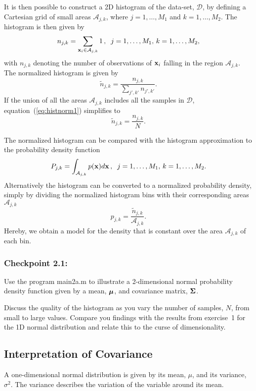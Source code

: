 \documentclass[times,12pt]{article}    %
\def\x{{\bf x}}
\def\A{\mathcal{A}}
\def\D{\mathcal{D}}
\def\m{\text{\boldmath $\mu$}}
\def\S{\text{\boldmath $\Sigma$}}
\begin{document}
It is then possible to construct a 2D histogram of the data-set, $\D$,
by defining a Cartesian grid of small areas $\A_{j,k}$, where $j=1,\ldots,
M_1$ and $k=1,\ldots, M_2$. The histogram
is then given by
\begin{equation}
  n_{j,k} =  \sum_{\x_i \in \A_{j,k}} 1 \,, \;\; j=1,\ldots,
M_1,\,k=1,\ldots, M_2,
\end{equation}
with $n_{j,k}$ denoting the number of observations of $\x_i$ falling in the region $\A_{j,k}$.
The normalized histogram is given by
\begin{equation}
\tilde{n}_{j,k} = \frac{n_{j,k}}{\sum_{j',k'} n_{{j',k'}}}.
\label{eq:histnorm1}
\end{equation}
If the union of all the areas $\A_{j,k}$ includes all the samples in
$\D$, equation~(\ref{eq:histnorm1}) simplifies to
\begin{equation}
\tilde{n}_{j,k} = \frac{n_{j,k}}{N}.
\label{eq:histnorm2}
\end{equation}

The normalized histogram can be compared with the histogram approximation
to the probability density function
\begin{equation}
P_{j,k} =  \int_{\A_{j,k}} p(\x) d\x \,, \;\; j=1,\ldots,
M_1,\,k=1,\ldots, M_2.
\end{equation}
Alternatively the histogram can be converted to a normalized probability density, simply by dividing the normalized histogram bins with their corresponding areas $\A_{j,k}$
\begin{equation}
p_{j,k} =  \frac{\tilde n_{j,k}}{\A_{j,k}}.
\end{equation}
Hereby, we obtain a model for the density that is constant over the area $\A_{j,k}$ of each bin.
\subsubsection*{Checkpoint 2.1:}
Use the program {\sf main2a.m} to illustrate a 2-dimensional normal
probability density function given by a mean, $\m$, and covariance
matrix, $\S$.

Discuss the quality of the histogram as you vary the number of samples, $N$, from small
 to large values.
Compare you findings with the results from exercise~1 for the 1D
normal distribution and relate this to the curse of dimensionality.

\subsection*{Interpretation of Covariance}
A one-dimensional normal distribution is given by its mean, $\mu$, and
its variance, $\sigma^2$. The variance describes the variation of
the variable around its mean.
\end{document}
